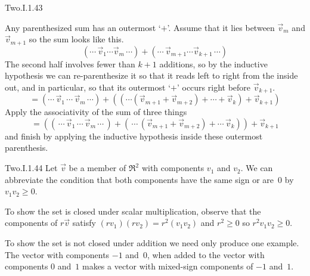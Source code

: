 \begin{ans}{Two.I.1.43}
\begin{exparts}
          Any parenthesized sum has an outermost `\( + \)'.
          Assume that it lies between \( \vec{v}_m \) and \( \vec{v}_{m+1} \)
          so the sum looks like this.
          \begin{equation*}
            (\cdots\,\vec{v}_1\cdots\vec{v}_m\,\cdots)
           +(\cdots\,\vec{v}_{m+1}\cdots\vec{v}_{k+1}\,\cdots)
          \end{equation*}
          The second half involves fewer than $k+1$ additions, so
          by the inductive hypothesis we can re-parenthesize it
          so that it reads left to right from the inside out, and in
          particular, so that its outermost `$+$' occurs right before
          $\vec{v}_{k+1}$.
          \begin{equation*}
            =(\cdots\,\vec{v}_1\,\cdots\,\vec{v}_m\,\cdots)
             +((\cdots(\vec{v}_{m+1}+\vec{v}_{m+2})+\cdots+\vec{v}_{k})
                 +\vec{v}_{k+1})
          \end{equation*}
          Apply the associativity of the sum of three things
          \begin{equation*}
            =((\,\cdots\, \vec{v}_1\,\cdots\,\vec{v}_m\,\cdots\,)
             +(\,\cdots\,(\vec{v}_{m+1}+\vec{v}_{m+2})+\cdots\,\vec{v}_k))
             +\vec{v}_{k+1}
          \end{equation*}
          and finish by applying the inductive hypothesis inside these
          outermost parenthesis.
      \end{exparts}
    
\end{ans}
\begin{ans}{Two.I.1.44}
     Let $\vec{v}$ be a member of $\Re^2$ with components $v_1$ and $v_2$.
     We can abbreviate the condition that both components have the same
     sign or are~$0$ by $v_1v_2\geq 0$.

     To show the set is closed under scalar multiplication, observe that
     the components of $r\vec{v}$ satisfy $(rv_1)(rv_2)=r^2(v_1v_2)$
     and $r^2\geq 0$ so $r^2v_1v_2\geq 0$.

     To show the set is not closed under addition we need only produce one
     example.
     The vector with components $-1$ and~$0$, when added to the vector
     with components $0$ and~$1$ makes a vector with mixed-sign components
     of $-1$ and~$1$.
   
\end{ans}
